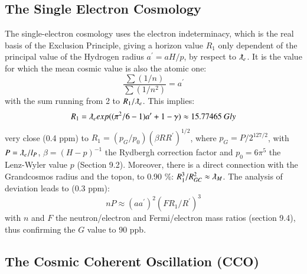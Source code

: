 \documentclass[twoside,draft]{article}
\begin{document}
\begin{sloppypar}
\subsection{The Single Electron Cosmology}

The single-electron cosmology \cite{Sanchez1} uses the electron indeterminacy, which is the real basis of the Exclusion Principle, giving a horizon value $R_1$ only dependent of the principal value of the Hydrogen radius $a^{\prime} = aH/p$, by respect to $\lambdabar_e$. It is the value for which the mean cosmic value is also the atomic one:
\begin{equation}
\frac{\sum(1/n)}{\sum(1/n^{2})} = a^{\prime}
\end{equation}
with the sum running from 2 to $R_{1} /\lambdabar_{e}$. This implies:
$$
R_{1} = \lambdabar_{e} exp((\pi^{2} /6 - 1)a^{\prime} + 1 - \gamma) \approx 15.77465 ~ Gly
$$
very close (0.4 ppm) to $R_{1} = ( p_{G} /p_{0} )(\beta R R^{\prime})^{1/2}$, where $p_{G} = P/2^{127/2}$, with $P = \lambdabar_e / l_P$, $\beta = (H - p)^{-1}$ the Rydbergh correction factor and $p_{0} = 6\pi^{5}$ the Lenz-Wyler value $p$ (Section 9.2). Moreover, there is a direct connection with the Grandcosmos radius and the topon, to 0.90 \%: $R_1^3/R_{GC}^2 \approx \lambdabar_M$. The analysis of deviation leads to (0.3 ppm):
\begin{equation}
nP \approx (aa^{\prime})^2 (FR_1/R^{\prime})^3
\end{equation}
with $n$ and $F$ the neutron/electron and Fermi/electron mass ratios (section 9.4), thus confirming the $G$ value to 90 ppb.

\subsection{The Cosmic Coherent Oscillation (CCO)}


\end{sloppypar}
\end{document}
